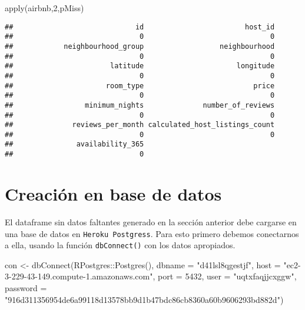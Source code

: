 \documentclass[
]{book}
\newenvironment{Shaded}{\begin{snugshade}}{\end{snugshade}}
\newcommand{\AttributeTok}[1]{\textcolor[rgb]{0.77,0.63,0.00}{#1}}
\newcommand{\DecValTok}[1]{\textcolor[rgb]{0.00,0.00,0.81}{#1}}
\newcommand{\FunctionTok}[1]{\textcolor[rgb]{0.00,0.00,0.00}{#1}}
\newcommand{\NormalTok}[1]{#1}
\newcommand{\OtherTok}[1]{\textcolor[rgb]{0.56,0.35,0.01}{#1}}
\newcommand{\SpecialCharTok}[1]{\textcolor[rgb]{0.00,0.00,0.00}{#1}}
\newcommand{\StringTok}[1]{\textcolor[rgb]{0.31,0.60,0.02}{#1}}
\begin{document}
\begin{Shaded}
\begin{Highlighting}[]
\FunctionTok{apply}\NormalTok{(airbnb,}\DecValTok{2}\NormalTok{,pMiss)}
\end{Highlighting}
\end{Shaded}

\begin{verbatim}
##                             id                        host_id 
##                              0                              0 
##            neighbourhood_group                  neighbourhood 
##                              0                              0 
##                       latitude                      longitude 
##                              0                              0 
##                      room_type                          price 
##                              0                              0 
##                 minimum_nights              number_of_reviews 
##                              0                              0 
##              reviews_per_month calculated_host_listings_count 
##                              0                              0 
##               availability_365 
##                              0
\end{verbatim}

\hypertarget{creaciuxf3n-en-base-de-datos}{%
\section{Creación en base de datos}\label{creaciuxf3n-en-base-de-datos}}

El dataframe sin datos faltantes generado en la sección anterior debe cargarse en una base de datos en \texttt{Heroku\ Postgress}. Para esto primero debemos conectarnos a ella, usando la función \texttt{dbConnect()} con los datos apropiados.

\begin{Shaded}
\begin{Highlighting}[]
\NormalTok{con }\OtherTok{\textless{}{-}} \FunctionTok{dbConnect}\NormalTok{(RPostgres}\SpecialCharTok{::}\FunctionTok{Postgres}\NormalTok{(), }
                \AttributeTok{dbname =} \StringTok{"d41lsl8qgestjf"}\NormalTok{, }
                \AttributeTok{host =} \StringTok{"ec2{-}3{-}229{-}43{-}149.compute{-}1.amazonaws.com"}\NormalTok{, }
                \AttributeTok{port =} \DecValTok{5432}\NormalTok{, }
                \AttributeTok{user =} \StringTok{"uqtxfaqjjcxggw"}\NormalTok{, }
                \AttributeTok{password =} \StringTok{"916d311356954de6a99118d13578bb9d1b47bdc86cb8360a60b9606293bd882d"}\NormalTok{)}
\end{Highlighting}
\end{Shaded}
\end{document}
